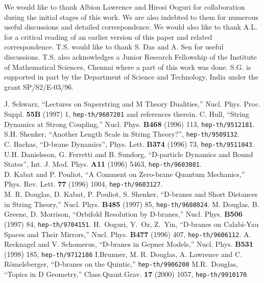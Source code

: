 \documentclass[a4paper,12pt]{article}
\begin{document}
 We would like to thank
Albion Lawrence and Hirosi Ooguri for collaboration during the initial 
stages of this work.
We are also indebted to them for numerous useful discussions and detailed
correspondence. We would also like to thank A.L. for a critical reading
of an earlier version of this paper and related correspondence. 
T.S. would like to thank S. Das and A. Sen for useful discussions. 
T.S. also acknowledges a Junior Research Fellowship of the 
Institute of Mathematical Sciences, Chennai where a part of this
work was done.  S.G. is supported in part by the Department of Science 
and Technology, India under the grant SP/S2/E-03/96.



\begin{thebibliography}{99}
 J. Schwarz, ``Lectures on Superstring and M Theory
Dualities,'' Nucl. Phys. Proc. Suppl. {\bf 55B} (1997) 1, 
{\tt hep-th/9607201} and references therein.
 C. Hull, ``String Dynamics at Strong Coupling,''
Nucl. Phys. {\bf B468} (1996) 113, {\tt hep-th/9512181}.
S.H. Shenker, ``Another Length Scale in String Theory?'',
{\tt hep-th/9509132}. \\
C. Bachas, ``D-brane Dynamics'', Phys. Lett. {\bf B374} (1996) 73,
{\tt hep-th/9511043}. \\
U.H. Danielsson, G. Ferretti and B. Sundorg, ``D-particle
Dynamics and Bound States'', Int. J. Mod. Phys. {\bf A11}
(1996) 5463, {\tt hep-th/9603081}. \\
D. Kabat and P. Pouliot, ``A Comment on Zero-brane Quantum Mechanics,''
Phys. Rev. Lett. {\bf 77} (1996) 1004, {\tt hep-th/9603127}. \\
M. R. Douglas, D. Kabat, P. Pouliot, S. Shenker,
``D-branes and Short Distances in String Theory,''
Nucl.  Phys. {\bf B485} (1997) 85,  {\tt hep-th/9608024}.
M. Douglas, B. Greene, D. Morrison, 
``Orbifold Resolution by D-branes,''
Nucl. Phys. {\bf B506} (1997) 84, {\tt hep-th/9704151}.
H.~Ooguri, Y.~Oz, Z.~Yin, 
``D-branes on Calabi-Yau Spaces and Their Mirrors,''
Nucl. Phys. {\bf B477} (1996) 407, {\tt hep-th/9606112}. 
A. Recknagel and V. Schomerus, ``D-branes in Gepner Models,'' 
Nucl. Phys. {\bf B531} (1998) 185, {\tt hep-th/9712186}
 I.Brunner, M. R. Douglas, A. Lawrence and C.
R\"omelsberger, ``D-branes on the Quintic,'' {\tt hep-th/9906200}
M.R.~Douglas, ``Topics in D Geometry,''
Class.Quant.Grav. {\bf 17} (2000) 1057, {\tt hep-th/9910170}.

\end{thebibliography}
\end{document}
